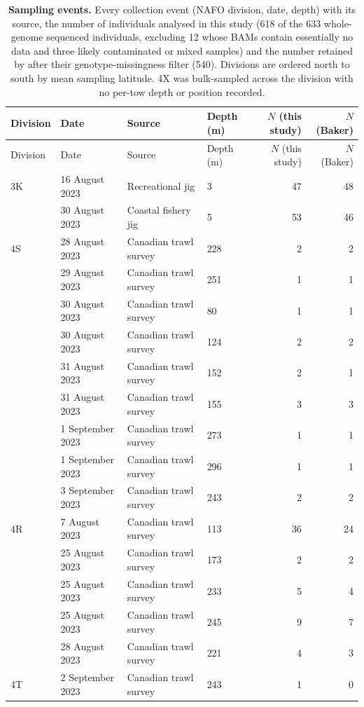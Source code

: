 \begin{longtable}{llllrr}
\caption{\textbf{Sampling events.} Every collection event (NAFO division, date, depth) with its source, the number of individuals analysed in this study (618 of the 633 whole-genome sequenced individuals, excluding 12 whose BAMs contain essentially no data and three likely contaminated or mixed samples) and the number retained by \citet{baker2025} after their genotype-missingness filter (540). Divisions are ordered north to south by mean sampling latitude. 4X was bulk-sampled across the division with no per-tow depth or position recorded.}\label{stab:sampling}\\
\toprule
Division & Date & Source & Depth (m) & $N$ (this study) & $N$ (Baker) \\
\midrule
\endfirsthead
\toprule
Division & Date & Source & Depth (m) & $N$ (this study) & $N$ (Baker) \\
\midrule
\endhead
3K & 16 August 2023 & Recreational jig & 3 & 47 & 48 \\
 & 30 August 2023 & Coastal fishery jig & 5 & 53 & 46 \\
4S & 28 August 2023 & Canadian trawl survey & 228 & 2 & 2 \\
 & 29 August 2023 & Canadian trawl survey & 251 & 1 & 1 \\
 & 30 August 2023 & Canadian trawl survey & 80 & 1 & 1 \\
 & 30 August 2023 & Canadian trawl survey & 124 & 2 & 2 \\
 & 31 August 2023 & Canadian trawl survey & 152 & 2 & 1 \\
 & 31 August 2023 & Canadian trawl survey & 155 & 3 & 3 \\
 & 1 September 2023 & Canadian trawl survey & 273 & 1 & 1 \\
 & 1 September 2023 & Canadian trawl survey & 296 & 1 & 1 \\
 & 3 September 2023 & Canadian trawl survey & 243 & 2 & 2 \\
4R & 7 August 2023 & Canadian trawl survey & 113 & 36 & 24 \\
 & 25 August 2023 & Canadian trawl survey & 173 & 2 & 2 \\
 & 25 August 2023 & Canadian trawl survey & 233 & 5 & 4 \\
 & 25 August 2023 & Canadian trawl survey & 245 & 9 & 7 \\
 & 28 August 2023 & Canadian trawl survey & 221 & 4 & 3 \\
4T & 2 September 2023 & Canadian trawl survey & 243 & 1 & 0 \\

\end{longtable}
